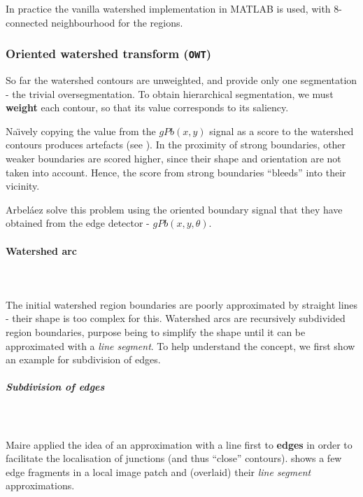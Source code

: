 In practice the vanilla watershed implementation in MATLAB \cite{MATLABwatershed} is used, with 8-connected neighbourhood for the regions.

\subsubsection{Oriented watershed transform ({\tt OWT})}
\label{sec:ch3-OWT}
So far %
the watershed contours are unweighted, %
and provide only one segmentation - the trivial oversegmentation. To obtain hierarchical segmentation, we must {\bf weight} each contour, so that its value corresponds to its saliency. %

Na\"{\i}vely copying the value from the $gPb(x,y)$ signal as a score to the watershed contours produces artefacts (see ). In the proximity of strong boundaries, other weaker boundaries are scored higher, since their shape and orientation are not taken into account. Hence, the score from strong boundaries ``bleeds'' into their vicinity.

Arbel\'aez \etal solve this problem using the oriented boundary signal that they have obtained from the edge detector - $gPb(x,y,\theta)$. 

\paragraph{Watershed arc}\mbox{}\\\mbox{}\\
\label{par:ch3-watershed-arc}
The initial watershed region boundaries are poorly approximated by straight lines - their shape is too complex for this. 
Watershed arcs are recursively subdivided region boundaries, purpose being to simplify the shape until it can be approximated with a {\it line segment}. To help understand the concept, we first show an example for subdivision of edges.

\subparagraph{Subdivision of edges}\mbox{}\\\mbox{}\\
Maire \etal \cite{Maire2008using} applied the idea of an approximation %
with a line first to {\bf edges} in order to facilitate the localisation of junctions (and thus ``close'' contours).  shows a few edge fragments in a local image patch and (overlaid) their {\it line segment} approximations.

